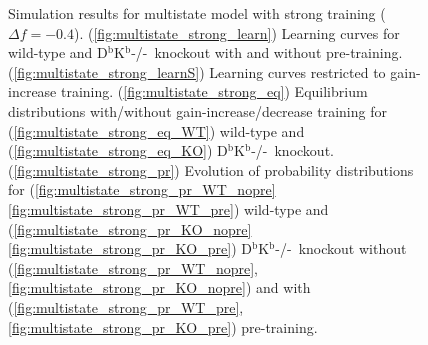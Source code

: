 \documentclass[12pt]{article}
\newcommand{\KO}{D$^\mathrm{b}$K$^\mathrm{b}$-/-}
\begin{document}
\begin{figure}
 \begin{center}
 \begin{myenuma}
  \item{}\label{fig:multistate_strong_learn}
  \item{}\label{fig:multistate_strong_learnS}
  \item\label{fig:multistate_strong_eq}\begin{myenumi}
                    \item{}\label{fig:multistate_strong_eq_WT}
                    \item{}\label{fig:multistate_strong_eq_KO}
                  \end{myenumi}
  \item\label{fig:multistate_strong_pr}\begin{myenumi}
                    \item{}\label{fig:multistate_strong_pr_WT_nopre}
                    \item{}\label{fig:multistate_strong_pr_WT_pre}
                    \item{}\label{fig:multistate_strong_pr_KO_nopre}
                    \item{}\label{fig:multistate_strong_pr_KO_pre}
                  \end{myenumi}
 \end{myenuma}
 \end{center}
  \caption{Simulation results for multistate model with strong training ($\Delta f=-0.4$).
  (\ref{fig:multistate_strong_learn}) Learning curves for wild-type and \KO\ knockout with and without pre-training.
  (\ref{fig:multistate_strong_learnS}) Learning curves restricted to gain-increase training.
  (\ref{fig:multistate_strong_eq}) Equilibrium distributions with/without gain-increase/decrease training for (\ref{fig:multistate_strong_eq_WT}) wild-type and (\ref{fig:multistate_strong_eq_KO}) \KO\ knockout.
  (\ref{fig:multistate_strong_pr}) Evolution of probability distributions for (\ref{fig:multistate_strong_pr_WT_nopre}\ref{fig:multistate_strong_pr_WT_pre}) wild-type and  (\ref{fig:multistate_strong_pr_KO_nopre}\ref{fig:multistate_strong_pr_KO_pre}) \KO\ knockout without (\ref{fig:multistate_strong_pr_WT_nopre},\ref{fig:multistate_strong_pr_KO_nopre}) and with (\ref{fig:multistate_strong_pr_WT_pre},\ref{fig:multistate_strong_pr_KO_pre}) pre-training. } \label{fig:multistate_strong}
\end{figure}
\end{document}
